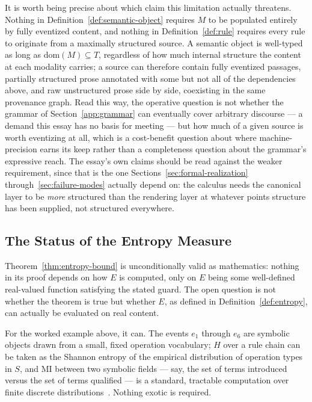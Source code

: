 \documentclass[11pt]{article}
\theoremstyle{definition}
\begin{document}
It is worth being precise about which claim this limitation actually threatens. Nothing in Definition~\ref{def:semantic-object} requires $M$ to be populated entirely by fully eventized content, and nothing in Definition~\ref{def:rule} requires every rule to originate from a maximally structured source. A semantic object is well-typed as long as $\mathrm{dom}(M) \subseteq T$, regardless of how much internal structure the content at each modality carries; a source can therefore contain fully eventized passages, partially structured prose annotated with some but not all of the dependencies above, and raw unstructured prose side by side, coexisting in the same provenance graph. Read this way, the operative question is not whether the grammar of Section~\ref{app:grammar} can eventually cover arbitrary discourse --- a demand this essay has no basis for meeting --- but how much of a given source is worth eventizing at all, which is a cost-benefit question about where machine-precision earns its keep rather than a completeness question about the grammar's expressive reach. The essay's own claims should be read against the weaker requirement, since that is the one Sections~\ref{sec:formal-realization} through~\ref{sec:failure-modes} actually depend on: the calculus needs the canonical layer to be \emph{more} structured than the rendering layer at whatever points structure has been supplied, not structured everywhere.

\subsection{The Status of the Entropy Measure}
\label{sec:entropy-status}

Theorem~\ref{thm:entropy-bound} is unconditionally valid as mathematics: nothing in its proof depends on how $E$ is computed, only on $E$ being some well-defined real-valued function satisfying the stated guard. The open question is not whether the theorem is true but whether $E$, as defined in Definition~\ref{def:entropy}, can actually be evaluated on real content.

For the worked example above, it can. The events $e_1$ through $e_6$ are symbolic objects drawn from a small, fixed operation vocabulary; $H$ over a rule chain can be taken as the Shannon entropy of the empirical distribution of operation types in $S$, and $\mathrm{MI}$ between two symbolic fields --- say, the set of terms introduced versus the set of terms qualified --- is a standard, tractable computation over finite discrete distributions~\cite{shannon1948}. Nothing exotic is required.
\end{document}
